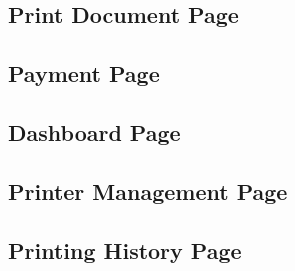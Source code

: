 \subsection{Print Document Page}

\subsection{Payment Page}

\subsection{Dashboard Page}

\subsection{Printer Management Page}

\subsection{Printing History Page}
